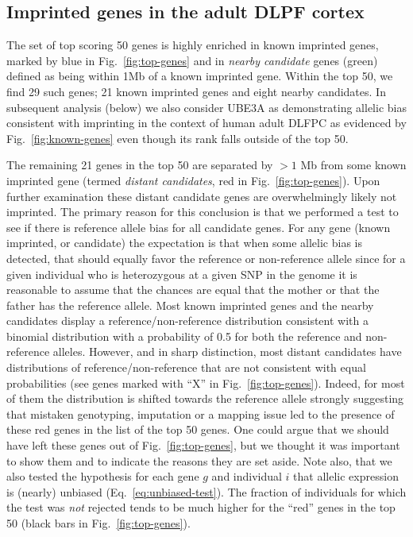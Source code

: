 \documentclass[letterpaper]{article}
\begin{document}
\subsection{Imprinted genes in the adult DLPF cortex}

The set of top scoring 50 genes is highly enriched in known imprinted genes,
marked by blue in Fig.~\ref{fig:top-genes} and in \emph{nearby candidate}
genes (green) defined as being within 1Mb of a known imprinted gene. Within
the top 50, we find 29 such genes; 21 known imprinted genes and eight nearby
candidates.  In subsequent analysis (below) we also consider UBE3A as
demonstrating allelic bias consistent with imprinting in the context of human
adult DLFPC as evidenced by Fig.~\ref{fig:known-genes} even though its rank
falls outside of the top 50.

The remaining 21 genes in the top 50 are separated by \(>1\) Mb from some
known imprinted gene (termed \emph{distant candidates}, red in
Fig.~\ref{fig:top-genes}).  Upon further examination these distant candidate
genes are overwhelmingly likely not imprinted. The primary reason for this
conclusion is that we performed a test to see if there is reference allele
bias for all candidate genes. For any gene (known imprinted, or candidate) the
expectation is that when some allelic bias is detected, that should equally
favor the reference or non-reference allele since for a given individual who
is heterozygous at a given SNP in the genome it is reasonable to assume that
the chances are equal that the mother or that the father has the reference
allele. Most known imprinted genes and the nearby candidates display a
reference/non-reference distribution consistent with a binomial distribution
with a probability of 0.5 for both the reference and non-reference alleles.
However, and in sharp distinction, most distant candidates have distributions
of reference/non-reference that are not consistent with equal probabilities
(see genes marked with ``X'' in Fig.~\ref{fig:top-genes}).  Indeed, for most of
them the distribution is shifted towards the reference allele strongly
suggesting that mistaken genotyping, imputation or a mapping issue led to the
presence of these red genes in the list of the top 50 genes. One could argue
that we should have left these genes out of Fig.~\ref{fig:top-genes}, but we
thought it was important to show them and to indicate the reasons they are set
aside.   Note also, that we also tested the hypothesis for each gene \(g\) and
individual \(i\) that allelic expression is (nearly) unbiased
(Eq.~\ref{eq:unbiased-test}).  The fraction of individuals for which the test
was \emph{not} rejected tends to be much higher for the ``red'' genes in the
top 50 (black bars in Fig.~\ref{fig:top-genes}).
\end{document}
